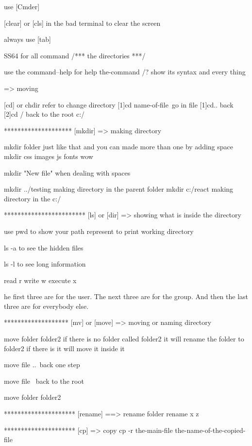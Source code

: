 use [Cmder]

[clear]  or [cls]  in the bad terminal 
to clear the screen 

always use [tab]

    SS64  for all command  
/*** the directories  ***/

use the command--help for help
the-command /? 
show its syntax and every thing 

=> moving 

[cd]   or chdir    refer to change directory 
[1]cd name-of-file\          go in file 
[1]cd..                      back 
[2]cd /                      back to the root   c:/


******************** [mkdir]  => making directory 

mkdir folder                      just like that and you can made more than one by adding space
mkdir css images js fonts         wow 

mkdir "New file"              when dealing with spaces

mkdir ../testing                  making directory in the parent folder
mkdir c:/react                    making directory in the c:/




************************  [ls] or [dir]   => showing what is inside the directory 

use pwd  to show your path 
represent to print working directory 

ls -a 
to see the hidden files 

ls -l 
to see long information

read   r 
write  w 
execute x

he first three are for the user. 
The next three are for the group. 
And then the last three are for everybody else.

******************* [mv] or [move]  => moving or naming  directory 

move folder folder2
if there is no folder called folder2 it will rename the folder to folder2 
if there is it will move it inside it

move file ..\   back one step

move file \     back to the root 

move folder folder2 

********************* [rename]  ==> rename folder
rename x z 



********************* [cp]  => copy
cp -r the-main-file  the-name-of-the-copied-file 

